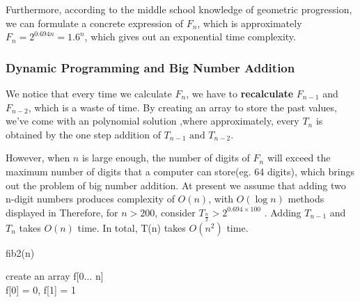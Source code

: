 Furthermore, according to the middle school knowledge of geometric progression, we can formulate a concrete expression of $F_n$, which is approximately $F_n=2^{0.694n}=1.6^{n}$, which gives out an exponential time complexity.

\subsubsection{Dynamic Programming and Big Number Addition}
We notice that every time we calculate $F_n$, we have to \textbf{recalculate} $F_{n-1}$ and $F_{n-2}$, which is a waste of time. 
By creating an array to store the past values, we've come with an polynomial solution ,where approximately, every $T_n$ is obtained by the one step addition of $T_{n-1} \text{ and } T_{n-2} $.

However, when $n$ is large enough, the number of digits of $F_n$ will exceed the maximum number of digits that a computer can store(eg. 64 digits), which brings out the problem of big number addition.
At present we assume that adding two n-digit numbers produces complexity of $O(n)$, with $O(\log n)$ methods displayed in %
Therefore, for $n > 200$, consider $T_{\frac{n}{2}} > 2^{0.694\times100} $ . Adding $T_{n-1}$ and $T_{n}$ takes $O(n)$ time. In total, T(n) takes $O(n^{2})$ time.
\begin{algorithm}
    \caption{fib2(n)}
    create an array f[0$\dots$ n]\\
    f[0] = 0, f[1] = 1\\
\end{algorithm}

